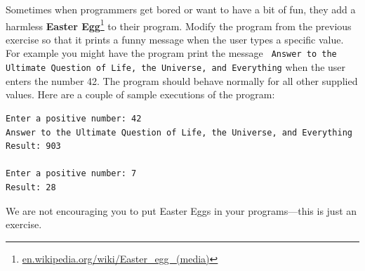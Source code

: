 \begin{ex}
Sometimes when programmers get bored or want to have a bit of fun,
they add a harmless {\bf Easter Egg}\footnote{\url{en.wikipedia.org/wiki/Easter_egg_(media)}} to their program. Modify the program from the previous exercise so that it prints a funny
message when the user types a specific value. For example you might have the program print the message \texttt{ Answer to the Ultimate Question of Life, the Universe, and Everything} when the user enters the number 42. 
The program should behave normally for all other supplied values.  Here are a couple of sample executions of the program:

\beforeverb
\begin{verbatim}
Enter a positive number: 42
Answer to the Ultimate Question of Life, the Universe, and Everything
Result: 903

Enter a positive number: 7
Result: 28
\end{verbatim}
\afterverb
%
We are not encouraging you to put Easter Eggs in your 
programs---this is just an exercise.

\end{ex}

